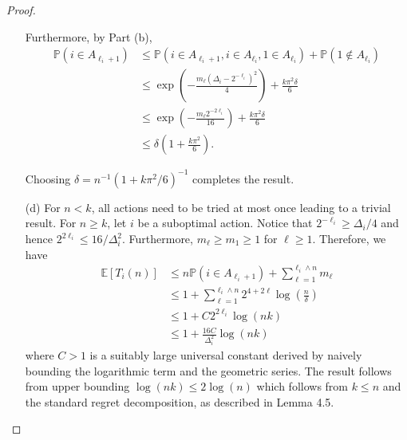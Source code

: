 \begin{proof}
\begin{enumerate}
        Furthermore, by Part (b),
        \begin{equation*}
            \begin{aligned}
                \mathbb{P}\left(i \in A_{\ell_{i}+1}\right) & \leq \mathbb{P}\left(i \in A_{\ell_{i}+1}, i \in A_{\ell_{i}}, 1 \in A_{\ell_{i}}\right)+\mathbb{P}\left(1 \notin A_{\ell_{i}}\right) \\
                & \leq \exp \left(-\frac{m_{\ell}\left(\Delta_{i}-2^{-\ell_{i}}\right)^{2}}{4}\right)+\frac{k \pi^{2} \delta}{6} \\
                & \leq \exp \left(-\frac{m_{\ell} 2^{-2 \ell_{i}}}{16}\right)+\frac{k \pi^{2} \delta}{6} \\
                & \leq \delta\left(1+\frac{k \pi^{2}}{6}\right).
            \end{aligned}
        \end{equation*}

        Choosing $\delta=n^{-1}\left(1+k \pi^{2} / 6\right)^{-1}$ completes the result.
    
        \item[(d)] For $n<k$, all actions need to be tried at most once leading to a trivial result.
        For $n \geq k$, let $i$ be a suboptimal action.
        Notice that $2^{-\ell_{i}} \geq \Delta_{i} / 4$ and hence $2^{2 \ell_{i}} \leq 16 / \Delta_{i}^{2}$.
        Furthermore, $m_{\ell} \geq m_{1} \geq 1$ for $\ell \geq 1$.
        Therefore, we have
        \begin{equation*}
            \begin{aligned}
                \mathbb{E}\left[T_{i}(n)\right] & \leq n \mathbb{P}\left(i \in A_{\ell_{i}+1}\right)+\sum_{\ell=1}^{\ell_{i} \wedge n} m_{\ell} \\
                & \leq 1+\sum_{\ell=1}^{\ell_{i} \wedge n} 2^{4+2 \ell} \log \left(\frac{n}{\delta}\right) \\
                & \leq 1+C 2^{2 \ell_{i}} \log (n k) \\
                & \leq 1+\frac{16 C}{\Delta_{i}^{2}} \log (n k)
            \end{aligned}
        \end{equation*}
        where $C>1$ is a suitably large universal constant derived by naively bounding the logarithmic
        term and the geometric series.
        The result follows from upper bounding $\log (n k) \leq 2 \log (n)$ which follows from $k \leq n$ and the standard regret decomposition, as described in Lemma 4.5. 

    \end{enumerate}
\end{proof}